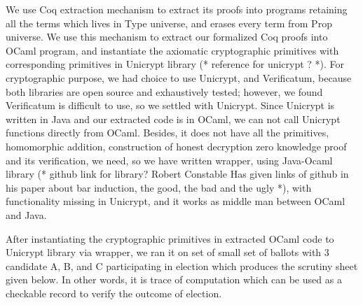 \documentclass{llncs}
\begin{document}
We use Coq extraction mechanism\cite{Letouzey:2003:NEC}  to extract its proofs into programs retaining all the terms which lives in Type universe, 
and erases every term  from Prop universe. 
We use this mechanism to extract our formalized Coq proofs into
 OCaml\cite{Leroy:2013:ORM} program, and instantiate the axiomatic cryptographic 
 primitives with corresponding primitives in Unicrypt library (* reference 
 for unicrypt ? *). For cryptographic purpose, we had choice to use 
 Unicrypt, and Verificatum, because both libraries
 are open source and exhaustively tested; however, we found Verificatum is 
 difficult to use, so we settled with Unicrypt. Since Unicrypt is written 
 in Java and our extracted code is in OCaml, we can not call Unicrypt functions 
 directly from OCaml. Besides, it does not have 
 all the primitives, homomorphic addition, construction of honest 
 decryption zero knowledge proof and its verification, 
 we need, so we have written wrapper, using Java-Ocaml library 
 (* github link for library? Robert Constable Has given links 
 of github in his paper about bar induction, the good, the bad and the 
 ugly *), with functionality missing 
 in Unicrypt, and it works as middle man between OCaml  and Java.
 

 
 After instantiating the  
 cryptographic primitives in extracted OCaml code 
 to Unicrypt library via wrapper, we ran it on set of
 small set of ballots with 3 candidate A, B, and C participating in election
 which produces the scrutiny sheet given below. In other words, 
 it is trace of computation which can be used as a checkable record to verify
 the outcome of election.
 
 
 
 
 
 
  
 
\end{document}

